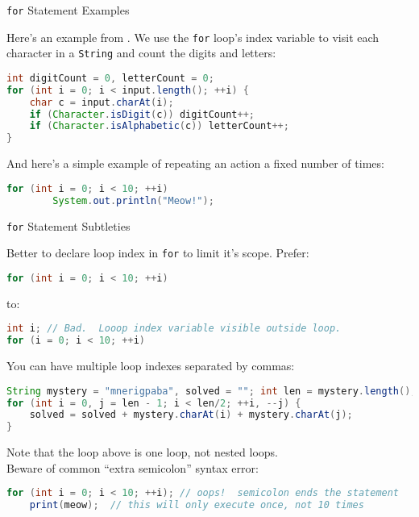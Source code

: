 \documentclass{beamer}
\begin{document}
\begin{frame}[fragile]{{\tt for} Statement Examples}


Here's an example from  .  We use the {\tt for} loop's index variable to visit each character in a {\tt String} and count the digits and letters:
\begin{lstlisting}[language=Java]
int digitCount = 0, letterCount = 0;
for (int i = 0; i < input.length(); ++i) {
    char c = input.charAt(i);
    if (Character.isDigit(c)) digitCount++;
    if (Character.isAlphabetic(c)) letterCount++;
}
\end{lstlisting}

And here's a simple example of repeating an action a fixed number of times:
\begin{lstlisting}[language=Java]
for (int i = 0; i < 10; ++i)
        System.out.println("Meow!");
\end{lstlisting}



\end{frame}

\begin{frame}[fragile]{{\tt for} Statement Subtleties}


Better to declare loop index in {\tt for} to limit it's scope.  Prefer:
\vspace{-.05in}
\begin{lstlisting}[language=Java]
for (int i = 0; i < 10; ++i)
\end{lstlisting}
\vspace{-.1in}
to:
\vspace{-.05in}
\begin{lstlisting}[language=Java]
int i; // Bad.  Looop index variable visible outside loop.
for (i = 0; i < 10; ++i)
\end{lstlisting}

You can have multiple loop indexes separated by commas:
\vspace{-.05in}
\begin{lstlisting}[language=Java]
String mystery = "mnerigpaba", solved = ""; int len = mystery.length();
for (int i = 0, j = len - 1; i < len/2; ++i, --j) {
    solved = solved + mystery.charAt(i) + mystery.charAt(j);
}
\end{lstlisting}

Note that the loop above is one loop, not nested loops.\\
\vspace{.025in}
Beware of common ``extra semicolon'' syntax error:
\vspace{-.05in}
\begin{lstlisting}[language=Java]
for (int i = 0; i < 10; ++i); // oops!  semicolon ends the statement
    print(meow);  // this will only execute once, not 10 times
\end{lstlisting}

\end{frame}
\end{document}
